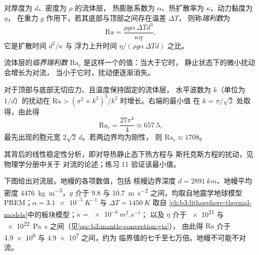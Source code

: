 \begin{definition}[瑞利数]\label{def:b3:mantle-convection:rayleigh}
对厚度为 $d$、密度为 $\rho$ 的流体层，
热膨胀系数为 $\alpha$、热扩散率为 $\kappa$、动力黏度为 $\eta$，
在重力 $g$ 作用下，若其底部与顶部之间存在温差 $\Delta T$，
则称\emph{瑞利数}为
\[
  \mathrm{Ra} = \frac{\rho g\alpha\,\Delta T d^3}{\kappa\eta},
\]
它是扩散时间 $d^2/\kappa$ 与
浮力上升时间 $\eta/(\rho g\alpha\,\Delta Td)$ 之比。
\end{definition}

\begin{definition}[临界瑞利数]\label{def:b3:mantle-convection:critical}
流体层的\emph{临界瑞利数}
$\mathrm{Ra}_c$ 是这样一个的值：当大于它时，
静止状态下的微小扰动会增长为对流，
当小于它时，扰动便逐渐消失。
\end{definition}

\begin{proposition}[对流的起始]\label{prop:b3:mantle-convection:onset}
对于顶部与底部无切应力、且温度保持固定的流体层，
水平波数为 $k$（单位为 $1/d$）的扰动在
$\mathrm{Ra} > (\pi^2 + k^2)^3/k^2$ 时增长。右端的最小值
在 $k = \pi/\sqrt2$ 处取得，由此得
\[
  \mathrm{Ra}_c = \frac{27\pi^4}{4} \approx 657.5,
\]
最先出现的胞元宽 $2\sqrt2\,d$。若两边界均为刚性，
则 $\mathrm{Ra}_c \approx 1708$。
\end{proposition}

\admitted
其背后的线性稳定性分析，即对导热静止态下热方程与
斯托克斯方程的扰动，见物理学分册中关于
对流的论述；练习 11 验证该最小值。

下图给出对流层。地幔的各项数值，包括
核幔边界深度 $d = \qty{2891}{km}$、地幔平均密度
\qty{4476}{kg.m^{-3}}，$g$ 介于 9.8 与
\qty{10.7}{m.s^{-2}} 之间，均取自地震学地球模型 PREM；$\alpha =
\qty{3.1e-5}{K^{-1}}$ 与 $\Delta T = \qty{1450}{K}$ 取自
\cref{ch:b3:lithosphere-thermal-models}中的板块模型；$\kappa = \qty{e-6}{m^2.s^{-1}}$；
以及 $\eta$ 介于 \num{e21} 与 \qty{e22}{Pa.s} 之间（见\cref{sec:b3:mantle-convection:gia}），
由此得 $\mathrm{Ra}$ 介于 \num{4.9e6} 与 \num{4.9e7} 之间，约为
临界值的七千至七万倍。地幔不可能不对流。

